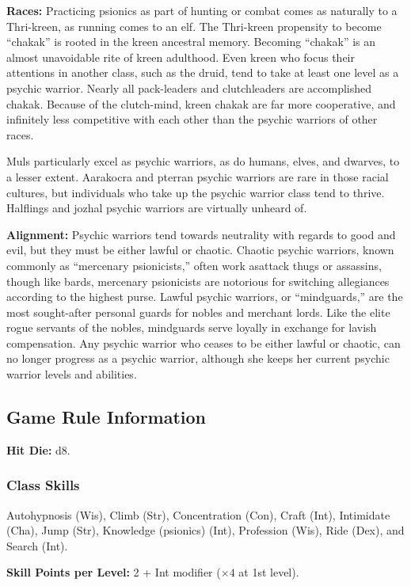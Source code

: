 \textbf{Races:} Practicing psionics as part of hunting or combat comes as naturally to a Thri-kreen, as running comes to an elf. The Thri-kreen propensity to become ``chakak'' is rooted in the kreen ancestral memory. Becoming ``chakak'' is an almost unavoidable rite of kreen adulthood. Even kreen who focus their attentions in another class, such as the druid, tend to take at least one level as a psychic warrior. Nearly all pack-leaders and clutchleaders are accomplished chakak. Because of the clutch-mind, kreen chakak are far more cooperative, and infinitely less competitive with each other than the psychic warriors of other races.

Muls particularly excel as psychic warriors, as do humans, elves, and dwarves, to a lesser extent. Aarakocra and pterran psychic warriors are rare in those racial cultures, but individuals who take up the psychic warrior class tend to thrive. Halflings and jozhal psychic warriors are virtually unheard of.

\textbf{Alignment:} Psychic warriors tend towards neutrality with regards to good and evil, but they must be either lawful or chaotic. Chaotic psychic warriors, known commonly as ``mercenary psionicists,'' often work asattack thugs or assassins, though like bards, mercenary psionicists are notorious for switching allegiances according to the highest purse. Lawful psychic warriors, or ``mindguards,'' are the most sought-after personal guards for nobles and merchant lords. Like the elite rogue servants of the nobles, mindguards serve loyally in exchange for lavish compensation. Any psychic warrior who ceases to be either lawful or chaotic, can no longer progress as a psychic warrior, although she keeps her current psychic warrior levels and abilities.

\subsection{Game Rule Information}

\textbf{Hit Die:} d8.

\subsubsection{Class Skills}
Autohypnosis (Wis), Climb (Str), Concentration (Con), Craft (Int), Intimidate (Cha), Jump (Str), Knowledge (psionics) (Int), Profession (Wis), Ride (Dex), and Search (Int).

\textbf{Skill Points per Level:} 2 + Int modifier ($\times 4$ at 1st level).

